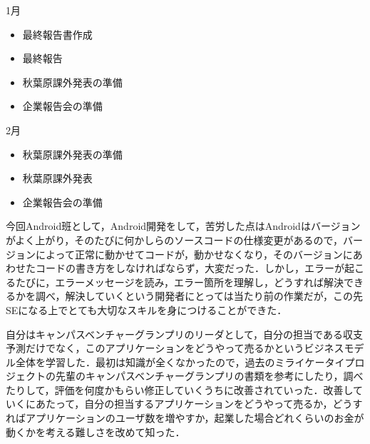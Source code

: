 1月
\begin{itemize}
\item 最終報告書作成
\item 最終報告
\item 秋葉原課外発表の準備
\item 企業報告会の準備
\end{itemize}
2月
\begin{itemize}
\item 秋葉原課外発表の準備
\item 秋葉原課外発表
\item 企業報告会の準備
\end{itemize}
\par
今回Android班として，Android開発をして，苦労した点はAndroidはバージョンがよく上がり，そのたびに何かしらのソースコードの仕様変更があるので，バージョンによって正常に動かせてコードが，動かせなくなり，そのバージョンにあわせたコードの書き方をしなければならず，大変だった．しかし，エラーが起こるたびに，エラーメッセージを読み，エラー箇所を理解し，どうすれば解決できるかを調べ，解決していくという開発者にとっては当たり前の作業だが，この先SEになる上でとても大切なスキルを身につけることができた．
\par
自分はキャンパスベンチャーグランプリのリーダとして，自分の担当である収支予測だけでなく，このアプリケーションをどうやって売るかというビジネスモデル全体を学習した．最初は知識が全くなかったので，過去のミライケータイプロジェクトの先輩のキャンパスベンチャーグランプリの書類を参考にしたり，調べたりして，評価を何度かもらい修正していくうちに改善されていった．改善していくにあたって，自分の担当するアプリケーションをどうやって売るか，どうすればアプリケーションのユーザ数を増やすか，起業した場合どれくらいのお金が動くかを考える難しさを改めて知った．

